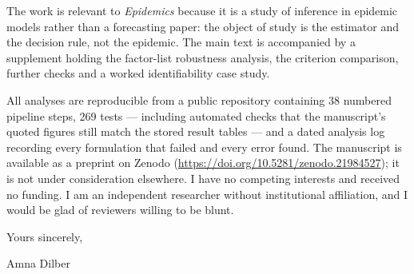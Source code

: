 \documentclass[11pt]{article}
\begin{document}
The work is relevant to \emph{Epidemics} because it is a study of inference in
epidemic models rather than a forecasting paper: the object of study is the
estimator and the decision rule, not the epidemic. The main text is accompanied
by a supplement holding the factor-list robustness analysis, the criterion
comparison, further checks and a worked identifiability case study.

All analyses are reproducible from a public repository containing 38 numbered
pipeline steps, 269 tests --- including automated checks that the manuscript's
quoted figures still match the stored result tables --- and a dated analysis
log recording every formulation that failed and every error found. The
manuscript is available as a preprint on Zenodo
(\url{https://doi.org/10.5281/zenodo.21984527}); it is not under consideration
elsewhere. I have no competing interests and received no funding. I am an
independent researcher without institutional affiliation, and I would be glad
of reviewers willing to be blunt.

Yours sincerely,

Amna Dilber
\end{document}
